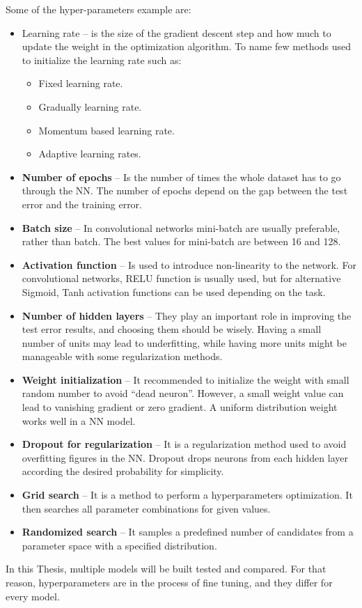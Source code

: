Some of the hyper-parameters example are:
\begin{itemize}
\item Learning rate – is the size of the gradient descent step and how much to update the weight in the optimization algorithm. To name few methods used to initialize the learning rate such as:
\begin{itemize}
\item Fixed learning rate.
\item Gradually learning rate.
\item Momentum based learning rate.
\item Adaptive learning rates.  
\end{itemize}
\item \textbf{Number of epochs} – Is the number of times the whole dataset has to go through the NN. The number of epochs depend on the gap between the test error and the training error.
\item \textbf{Batch size} – In convolutional networks mini-batch are usually preferable, rather than batch. The best values for mini-batch are between 16 and 128.
\item \textbf{Activation function} – Is used to introduce non-linearity to the network. For convolutional networks, RELU function is usually used, but for alternative Sigmoid, Tanh activation functions can be used depending on the task. 
\item \textbf{Number of hidden layers} – They play an important role in improving the test error results, and choosing them should be wisely. Having a small number of units may lead to underfitting, while having more units might be manageable with some regularization methods.
\item \textbf{Weight initialization} – It recommended to initialize the weight with small random number to avoid “dead neuron”. However, a small weight value can lead to vanishing gradient or zero gradient. A uniform distribution weight works well in a NN model.
\item \textbf{Dropout for regularization} – It is a regularization method used to avoid overfitting figures in the NN. Dropout drops neurons from each hidden layer according the desired probability for simplicity.
\item \textbf{Grid search} – It is a method to perform a hyperparameters optimization. It then searches all parameter combinations for given values.
\item \textbf{Randomized search} – It samples a predefined number of candidates from a parameter space with a specified distribution.  
\end{itemize}
\hspace{5mm} In this Thesis, multiple models will be built tested and compared. For that reason, hyperparameters are in the process of fine tuning, and they differ for every model.


